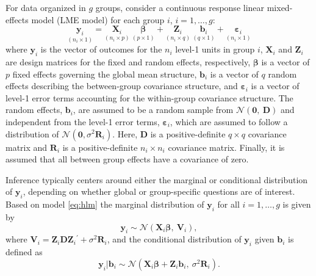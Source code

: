\documentclass[12pt]{article}
\newcommand{\trans}{\ensuremath{^\prime}}
\begin{document}
For data organized in $g$ groups, consider a continuous response linear mixed-effects model (LME model) for each group $i$, $i=1, \ldots, g$:
%
\begin{equation}\label{eq:hlm}
	\underset{(n_i \times 1)}{\bm{y}_i} = \underset{(n_i \times p)}{\bm{X}_i} \ \underset{(p \times 1)}{\bm{\beta}} + \underset{(n_i \times q)}{\bm{Z}_i} \ \underset{(q \times 1)}{\bm{b}_i} + \underset{(n_i \times 1)}{\bm{\varepsilon}_i}
\end{equation}
%
where $\bm{y}_i$ is the vector of outcomes for the $n_i$ level-1 units in group $i$, $\bm{X}_i$ and $\bm{Z}_i$ are design matrices for the fixed and random effects, respectively, $\bm{\beta}$ is a vector of $p$ fixed effects governing the global mean structure, $\bm{b}_i$ is a vector of $q$ random effects describing the between-group covariance structure, and $\bm{\varepsilon}_i$ is a vector of level-1 error terms accounting for the within-group covariance structure. The random effects,  $\bm{b}_i$,  are assumed to be a random sample from $\mathcal{N}(\bm{0},\ \bm{D})$ and independent from the level-1 error terms,  $\bm{\varepsilon}_i$, which are assumed to follow a distribution of $\mathcal{N}(\bm{0},\sigma^2 \bm{R}_i)$. 
Here, $\bm{D}$ is a positive-definite $q \times q$ covariance matrix and $\bm{R}_i$ is a positive-definite $n_i \times n_i$ covariance matrix.
Finally, it is assumed that all between group effects have a covariance of zero.


Inference typically centers around either the marginal or conditional distribution of $\bm{y}_i$, depending on whether global or group-specific questions are of interest.
Based on model \eqref{eq:hlm} the marginal distribution of $\bm{y}_i$ for all $i = 1, \ldots, g$ is given by
%
\begin{equation}\label{eq:marginalmod}
\bm{y}_i \sim \mathcal{N}\left(\bm{X}_i\bm{\beta},\ \bm{V}_i \right),
\end{equation}
%
where $\bm{V}_i = \bm{Z}_i \bm{DZ}_i\trans + \sigma^2 \bm{R}_i$, and the conditional distribution of $\bm{y}_i$ given $\bm{b}_i$ is defined as
%
\begin{equation}\label{eq:conditionalmod}
\bm{y}_i | \bm{b}_i \sim \mathcal{N}\left(\bm{X}_i\bm{\beta} + \bm{Z}_i \bm{b}_i, \ \sigma^2 \bm{R}_i \right).
\end{equation}
%
\end{document}
